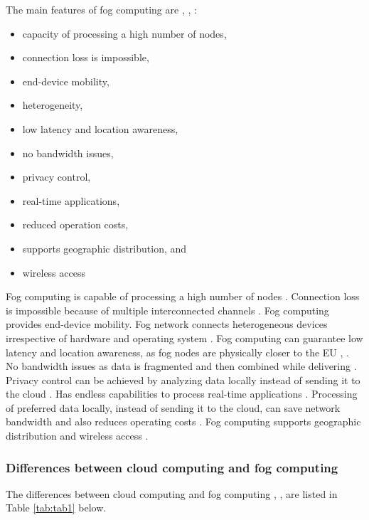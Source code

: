 The main features of fog computing are \cite{mukherjee2018survey}, \cite{nat}, \cite{far}:
\begin{itemize}
    \item capacity of processing a high number of nodes,
    \item connection loss is impossible,
    \item end-device mobility,
    \item heterogeneity,
    \item low latency and location awareness,
    \item no bandwidth issues,
    \item privacy control,
    \item real-time applications,
    \item reduced operation costs,
    \item supports geographic distribution, and
    \item wireless access               
\end{itemize}

Fog computing is capable of processing a high number of nodes \cite{mukherjee2018survey}. Connection loss is impossible because of multiple interconnected channels \cite{nat}. Fog computing provides end-device mobility. Fog network connects heterogeneous devices irrespective of hardware and operating system \cite{madakam2018fog}. Fog computing can guarantee low latency and location awareness, as fog nodes are physically closer to the EU \cite{nat}, \cite{10.1145/3022636.3022649}. No bandwidth issues as data is fragmented and then combined while delivering \cite{nat}. Privacy control can be achieved by analyzing data locally instead of sending it to the cloud \cite{far}. Has endless capabilities to process real-time applications \cite{mukherjee2018survey}. Processing of preferred data locally, instead of sending it to the cloud, can save network bandwidth and also reduces operating costs \cite{far}. Fog computing supports geographic distribution and wireless access \cite{mukherjee2018survey}. 


\subsubsection{Differences between cloud computing and fog computing}

The differences between cloud computing and fog computing \cite{mukherjee2018survey}, \cite{nat}, \cite{edu} are listed in Table \ref{tab:tab1} below.

